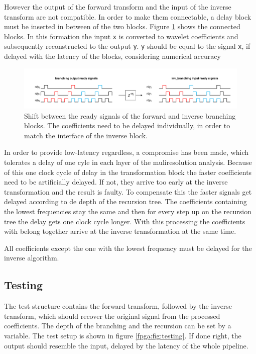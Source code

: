 \begin{refsection}
However the output of the forward transform and the input of the inverse transform are not compatible.
In order to make them connectable, a delay block must be inserted in between of the two blocks.
Figure \ref{fpga:fig:delay} shows the connected blocks. %
In this formation the input \texttt{x} is converted to wavelet coefficients and subsequently reconstructed to the output \texttt{y}.
\texttt{y} should be equal to the signal \texttt{x}, if delayed with the latency of the blocks, considering numerical accuracy
\begin{figure}
	\centering
	\includegraphics[width=\textwidth]{papers/fpga/images/delay.pdf}
	\caption{
		Shift between the ready signals of the forward and inverse branching blocks.
		The coefficients need to be delayed individually, in order to match the interface of the inverse block.
	}
	\label{fpga:fig:delay}
\end{figure}


In order to provide low-latency regardless, a compromise has been made, which tolerates a delay of one cyle in each layer of the muliresolution analysis.
Because of this one clock cycle of delay in the transformation block the faster coefficients need to be artificially delayed.
If not, they arrive too early at the inverse transformation and the result is faulty. To compensate this the faster signals get delayed according to de depth of the recursion tree.
The coefficients containing the lowest frequencies stay the same and then for every step up on the recursion tree the delay gets one clock cycle longer.
With this processing the coefficients with belong together arrive at the inverse transformation at the same time.

All coefficients except the one with the lowest frequency must be delayed for the inverse algorithm.

\subsection{Testing}

The test structure contains the forward transform, followed by the inverse transform, which should recover the original signal from the processed coefficients.
The depth of the branching and the recursion can be set by a variable. 
The test setup is shown in figure \ref{fpga:fig:testing}.
If done right, the output should resemble the input, delayed by the latency of the whole pipeline.


\end{refsection}
